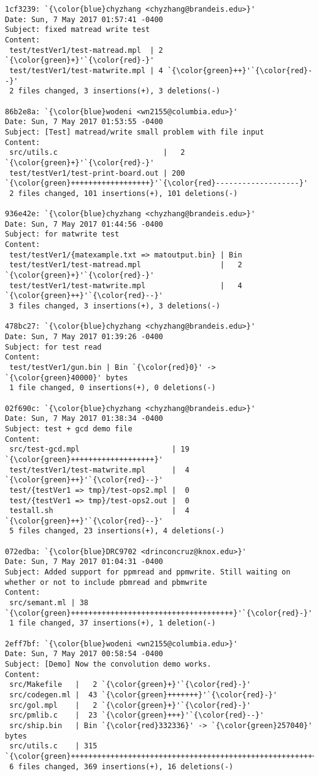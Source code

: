 \begin{lstlisting}
1cf3239: `{\color{blue}chyzhang <chyzhang@brandeis.edu>}'
Date: Sun, 7 May 2017 01:57:41 -0400
Subject: fixed matread write test
Content: 
 test/testVer1/test-matread.mpl  | 2 `{\color{green}+}'`{\color{red}-}'
 test/testVer1/test-matwrite.mpl | 4 `{\color{green}++}'`{\color{red}--}'
 2 files changed, 3 insertions(+), 3 deletions(-)

86b2e8a: `{\color{blue}wodeni <wn2155@columbia.edu>}'
Date: Sun, 7 May 2017 01:53:55 -0400
Subject: [Test] matread/write small problem with file input
Content: 
 src/utils.c                        |   2 `{\color{green}+}'`{\color{red}-}'
 test/testVer1/test-print-board.out | 200 `{\color{green}++++++++++++++++++}'`{\color{red}-------------------}'
 2 files changed, 101 insertions(+), 101 deletions(-)

936e42e: `{\color{blue}chyzhang <chyzhang@brandeis.edu>}'
Date: Sun, 7 May 2017 01:44:56 -0400
Subject: for matwrite test
Content: 
 test/testVer1/{matexample.txt => matoutput.bin} | Bin
 test/testVer1/test-matread.mpl                  |   2 `{\color{green}+}'`{\color{red}-}'
 test/testVer1/test-matwrite.mpl                 |   4 `{\color{green}++}'`{\color{red}--}'
 3 files changed, 3 insertions(+), 3 deletions(-)

478bc27: `{\color{blue}chyzhang <chyzhang@brandeis.edu>}'
Date: Sun, 7 May 2017 01:39:26 -0400
Subject: for test read
Content: 
 test/testVer1/gun.bin | Bin `{\color{red}0}' -> `{\color{green}40000}' bytes
 1 file changed, 0 insertions(+), 0 deletions(-)

02f690c: `{\color{blue}chyzhang <chyzhang@brandeis.edu>}'
Date: Sun, 7 May 2017 01:38:34 -0400
Subject: test + gcd demo file
Content: 
 src/test-gcd.mpl                     | 19 `{\color{green}+++++++++++++++++++}'
 test/testVer1/test-matwrite.mpl      |  4 `{\color{green}++}'`{\color{red}--}'
 test/{testVer1 => tmp}/test-ops2.mpl |  0
 test/{testVer1 => tmp}/test-ops2.out |  0
 testall.sh                           |  4 `{\color{green}++}'`{\color{red}--}'
 5 files changed, 23 insertions(+), 4 deletions(-)

072edba: `{\color{blue}DRC9702 <drinconcruz@knox.edu>}'
Date: Sun, 7 May 2017 01:04:31 -0400
Subject: Added support for ppmread and ppmwrite. Still waiting on whether or not to include pbmread and pbmwrite
Content: 
 src/semant.ml | 38 `{\color{green}+++++++++++++++++++++++++++++++++++++}'`{\color{red}-}'
 1 file changed, 37 insertions(+), 1 deletion(-)

2eff7bf: `{\color{blue}wodeni <wn2155@columbia.edu>}'
Date: Sun, 7 May 2017 00:58:54 -0400
Subject: [Demo] Now the convolution demo works.
Content: 
 src/Makefile   |   2 `{\color{green}+}'`{\color{red}-}'
 src/codegen.ml |  43 `{\color{green}+++++++}'`{\color{red}-}'
 src/gol.mpl    |   2 `{\color{green}+}'`{\color{red}-}'
 src/pmlib.c    |  23 `{\color{green}+++}'`{\color{red}--}'
 src/ship.bin   | Bin `{\color{red}332336}' -> `{\color{green}257040}' bytes
 src/utils.c    | 315 `{\color{green}++++++++++++++++++++++++++++++++++++++++++++++++++++++++}'`{\color{red}-}'
 6 files changed, 369 insertions(+), 16 deletions(-)


\end{lstlisting}
